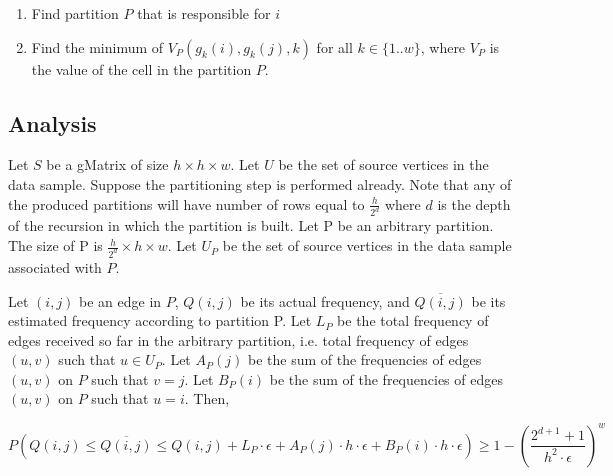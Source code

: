 \begin{enumerate}
  \item Find partition $P$ that is responsible for $i$
  \item Find the minimum of $V_P(g_k(i),g_k(j),k)$ for all $k \in \{1..w\}$, where $V_P$ is the value of the cell in the partition $P$. 
\end{enumerate}

\subsection{Analysis}

Let $S$ be a gMatrix of size $h\times h\times w$. Let $U$ be the set of source vertices in the data sample. Suppose the partitioning step is performed already. Note that any of the produced partitions will have number of rows equal to $\frac{h}{2^d}$ where $d$ is the depth of the recursion in which the partition is built. Let P be an arbitrary partition. The size of P is $\frac{h}{2^d}\times h\times w$. Let $U_P$ be the set of source vertices in the data sample associated with $P$.



\begin{theorem}
\label{probguarantee}
  Let $(i,j)$ be an edge in $P$, $Q(i,j)$ be its actual frequency, and $\overline{Q(i,j)}$ be its estimated frequency according to partition P. Let $L_P$ be the total frequency of edges received so far in the arbitrary partition, i.e. total frequency of edges $(u,v)$ such that $u \in U_P$. Let $A_P(j)$ be the sum of the frequencies of edges $(u,v)$ on $P$ such that $v=j$. Let $B_P(i)$ be the sum of the frequencies of edges $(u,v)$ on $P$ such that $u=i$. Then,
  
  \[
P(Q(i,j) \leq \overline{Q(i,j)} \leq Q(i,j) + L_P \cdot \epsilon + A_P(j) \cdot h \cdot \epsilon + B_P(i) \cdot h \cdot \epsilon) \geq 1-(\frac{2^{d+1}+1}{h^2\cdot\epsilon})^w
\]

\end{theorem}

